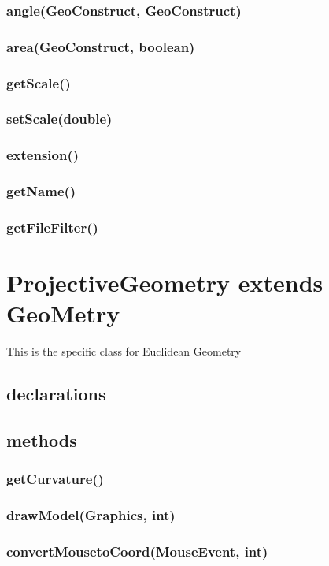 \documentclass[a4paper,10pt]{report}
\begin{document}
\subsubsection{angle(GeoConstruct, GeoConstruct)} 
\subsubsection{area(GeoConstruct, boolean)} 
\subsubsection{getScale()} 
\subsubsection{setScale(double)} 
\subsubsection{extension()} 
\subsubsection{getName()} 
\subsubsection{getFileFilter()}
\section{ProjectiveGeometry extends GeoMetry} This is the specific class for Euclidean Geometry
\subsection{declarations}
\subsubsection{}
\subsection{methods}
\subsubsection{getCurvature()}
\subsubsection{drawModel(Graphics, int)}
\subsubsection{convertMousetoCoord(MouseEvent, int)}
\end{document}
